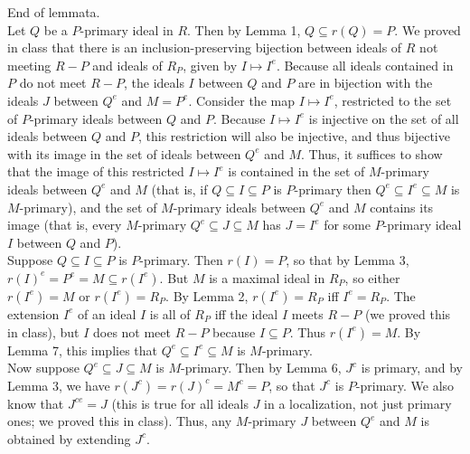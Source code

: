 \documentclass[11pt]{article}
\begin{document}

End of lemmata.\\

Let $Q$ be a $P$-primary ideal in $R$. Then by Lemma 1, $Q\subseteq r(Q)=P$. We proved in class that there is an inclusion-preserving bijection between ideals of $R$ not meeting $R-P$ and ideals of $R_P$, given by $I\mapsto I^e$. Because all ideals contained in $P$ do not meet $R-P$, the ideals $I$ between $Q$ and $P$ are in bijection with the ideals $J$ between $Q^e$ and $M=P^e$. Consider the map $I\mapsto I^e$, restricted to the set of $P$-primary ideals between $Q$ and $P$. Because $I\mapsto I^e$ is injective on the set of all ideals between $Q$ and $P$, this restriction will also be injective, and thus bijective with its image in the set of ideals between $Q^e$ and $M$. Thus, it suffices to show that the image of this restricted $I\mapsto I^e$ is contained in the set of $M$-primary ideals between $Q^e$ and $M$ (that is, if $Q\subseteq I\subseteq P$ is $P$-primary then $Q^e\subseteq I^e\subseteq M$ is $M$-primary), and the set of $M$-primary ideals between $Q^e$ and $M$ contains its image (that is, every $M$-primary $Q^e\subseteq J\subseteq M$ has $J=I^e$ for some $P$-primary ideal $I$ between $Q$ and $P$).\\

Suppose $Q\subseteq I\subseteq P$ is $P$-primary. Then $r(I)=P$, so that by Lemma 3, $r(I)^e=P^e=M\subseteq r(I^e)$. But $M$ is a maximal ideal in $R_P$, so either $r(I^e)=M$ or $r(I^e)=R_P$. By Lemma 2, $r(I^e)=R_P$ iff $I^e=R_P$. The extension $I^e$ of an ideal $I$ is all of $R_P$ iff the ideal $I$ meets $R-P$ (we proved this in class), but $I$ does not meet $R-P$ because $I\subseteq P$. Thus $r(I^e)=M$. By Lemma 7, this implies that $Q^e\subseteq I^e\subseteq M$ is $M$-primary.\\

Now suppose $Q^e\subseteq J\subseteq M$ is $M$-primary. Then by Lemma 6, $J^c$ is primary, and by Lemma 3, we have $r(J^c)=r(J)^c=M^c=P$, so that $J^c$ is $P$-primary. We also know that $J^{ce}=J$ (this is true for all ideals $J$ in a localization, not just primary ones; we proved this in class). Thus, any $M$-primary $J$ between $Q^e$ and $M$ is obtained by extending $J^c$.\\[-0.2in]
\end{document}
